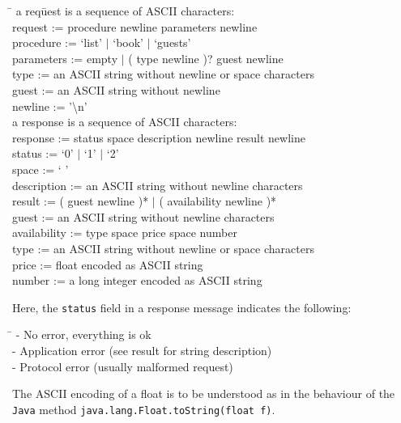 \documentclass[a4paper,10pt]{article}
\begin{document}
\begin{tabbing}
\hspace{20pt}\=\kill
 \> a req\=uest is a sequence of \textsc{ASCII} characters: \+\\
 \> request := procedure newline parameters newline\\
 \> procedure := `list' $\vert$ `book' $\vert$ `guests'\\
 \> parameters := empty $\vert$ ( type newline )? guest newline\\
 \> type := an ASCII string without newline or space characters\\
 \> guest := an ASCII string without newline\\
 \> newline := '\textbackslash n' \-\\
 \> a response is a sequence of \textsc{ASCII} characters:\+ \\
 \> response := status space description newline result newline \\
 \> status := `0' $\vert$ `1' $\vert$ `2'\\
 \> space := ` '\\
 \> description := an ASCII string without newline characters\\
 \> result := ( guest newline )* $\vert$ ( availability newline )*\\
 \> guest := an ASCII string without newline characters\\
 \> availability := type space price space number\\
 \> type := an ASCII string without newline or space characters\\
 \> price := float encoded as ASCII string\\
 \> number := a long integer encoded as ASCII string
\end{tabbing}

Here, the \texttt{status} field in a response message indicates the
 following:
\begin{tabbing}
\hspace{20pt}\=\kill
  - No error, everything is ok\\
  - Application error (see result for string description)\\
  - Protocol error (usually malformed request)
\end{tabbing}

The \textsc{ASCII} encoding of a float is to be understood as in the
behaviour of the \texttt{Java} method
\texttt{java.lang.Float.toString(float f)}.
\end{document}

